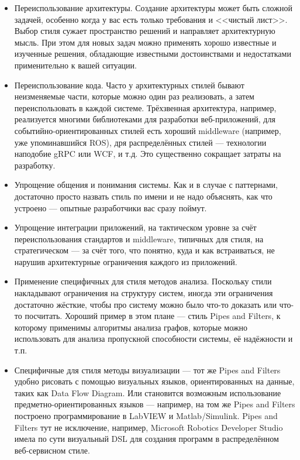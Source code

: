 \documentclass{../../text-style}
\begin{document}
\begin{itemize}
    \item Переиспользование архитектуры. Создание архитектуры может быть сложной задачей, особенно когда у вас есть только требования и <<чистый лист>>. Выбор стиля сужает пространство решений и направляет архитектурную мысль. При этом для новых задач можно применять хорошо известные и изученные решения, обладающие известными достоинствами и недостатками применительно к вашей ситуации.
    \item Переиспользование кода. Часто у архитектурных стилей бывают неизменяемые части, которые можно один раз реализовать, а затем переиспользовать в каждой системе. Трёхзвенная архитектура, например, реализуется многими библиотеками для разработки веб-приложений, для событийно-ориентированных стилей есть хороший middleware (например, уже упоминавшийся ROS), дря распределённых стилей --- технологии наподобие gRPC или WCF, и т.д. Это существенно сокращает затраты на разработку.
    \item Упрощение общения и понимания системы. Как и в случае с паттернами, достаточно просто назвать стиль по имени и не надо объяснять, как что устроено --- опытные разработчики вас сразу поймут.
    \item Упрощение интеграции приложений, на тактическом уровне за счёт переиспользования стандартов и middleware, типичных для стиля, на стратегическом --- за счёт того, что понятно, куда и как встраиваться, не нарушив архитектурные ограничения каждого из приложений.
    \item Применение специфичных для стиля методов анализа. Поскольку стили накладывают ограничения на структуру систем, иногда эти ограничения достаточно жёсткие, чтобы про систему можно было что-то доказать или что-то посчитать. Хороший пример в этом плане --- стиль Pipes and Filters, к которому применимы алгоритмы анализа графов, которые можно использовать для анализа пропускной способности системы, её надёжности и т.п.
    \item Специфичные для стиля методы визуализации --- тот же Pipes and Filters удобно рисовать с помощью визуальных языков, ориентированных на данные, таких как Data Flow Diagram. Или становится возможным использование предметно-ориентированных языков --- например, на том же Pipes and Filters построено программирование в LabVIEW и Matlab/Simulink. Pipes and Filters тут не исключение, например, Microsoft Robotics Developer Studio имела по сути визуальный DSL для создания программ в распределённом веб-сервисном стиле.
\end{itemize}
\end{document}
